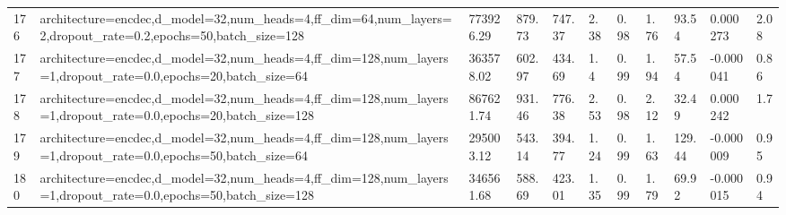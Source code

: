 \begin{longtable}{C{0.8cm} L{2cm} C{1.15cm} C{1.15cm} C{1.15cm} C{1.15cm} C{0.85cm} C{1.25cm} C{1.2cm} C{1.5cm} C{1.0cm}}
176 & architecture=encdec,\newline d\_model=32,\newline num\_heads=4,\newline ff\_dim=64,\newline num\_layers=2,\newline dropout\_rate=0.2,\newline epochs=50,\newline batch\_size=128 & 773926.29 & 879.73 & 747.37 & 2.38 & 0.98 & 1.76 & 93.54 & 0.000273 & 2.08 \\
177 & architecture=encdec,\newline d\_model=32,\newline num\_heads=4,\newline ff\_dim=128,\newline num\_layers=1,\newline dropout\_rate=0.0,\newline epochs=20,\newline batch\_size=64 & 363578.02 & 602.97 & 434.69 & 1.4 & 0.99 & 1.94 & 57.54 & -0.000041 & 0.86 \\
178 & architecture=encdec,\newline d\_model=32,\newline num\_heads=4,\newline ff\_dim=128,\newline num\_layers=1,\newline dropout\_rate=0.0,\newline epochs=20,\newline batch\_size=128 & 867621.74 & 931.46 & 776.38 & 2.53 & 0.98 & 2.12 & 32.49 & 0.000242 & 1.7 \\
179 & architecture=encdec,\newline d\_model=32,\newline num\_heads=4,\newline ff\_dim=128,\newline num\_layers=1,\newline dropout\_rate=0.0,\newline epochs=50,\newline batch\_size=64 & 295003.12 & 543.14 & 394.77 & 1.24 & 0.99 & 1.63 & 129.44 & -0.000009 & 0.95 \\
180 & architecture=encdec,\newline d\_model=32,\newline num\_heads=4,\newline ff\_dim=128,\newline num\_layers=1,\newline dropout\_rate=0.0,\newline epochs=50,\newline batch\_size=128 & 346561.68 & 588.69 & 423.01 & 1.35 & 0.99 & 1.79 & 69.92 & -0.000015 & 0.94 \\

\end{longtable}
